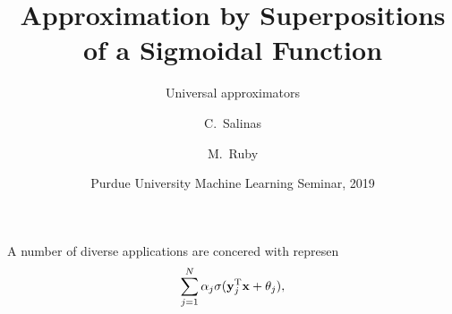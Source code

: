 \documentclass[12pt,letterpape]{beamer}
\title[Approximation by a Sigmoidal Function] 
{Approximation by Superpositions of a Sigmoidal Function}
\subtitle{Universal approximators}
\author[C.\ Salinas, M.\ Ruby] 
{C.\ Salinas\inst{1} \and M.\ Ruby\inst{1}}
\institute[Universities Here and There] %
{
  \inst{1}%
  Department of Mathematics\\
  Purdue University
 }
\date[Spring 2019] %
{Purdue University Machine Learning Seminar, 2019}
\begin{document}
\frame{\titlepage}

\begin{frame}
  A number of diverse applications are concered with represen
  \[
    \sum_{j=1}^N\alpha_j\sigma(\mathbf{y}_j^{\mathrm{T}}\mathbf{x}+\theta_j),
  \]
\end{frame}
\end{document}
